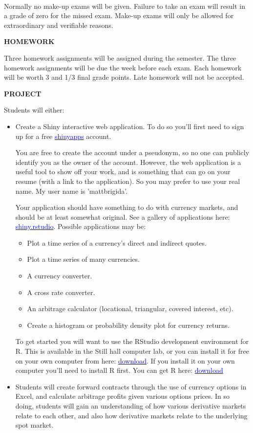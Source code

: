 \documentclass{article}
\begin{document}
\\
Normally no make-up exams will be given.  Failure to take an exam will result in a grade of zero for the missed exam.  Make-up exams will only be allowed for extraordinary and verifiable reasons.
\\
\begin{center}
{\bf HOMEWORK}
\end{center}
Three homework assignments will be assigned during the semester.   The three homework assignments will be due the week before each exam. Each homework will be worth 3 and 1/3 final grade points.  Late homework will not be accepted.
\\
\begin{center}
{\bf PROJECT}
\end{center}
Students will either:
\begin{itemize}
\item Create a Shiny interactive web application.  To do so you'll first need to sign up for a free \href{https://www.shinyapps.io/}{\textcolor{blue}{shinyapps}} account.  

You are free to create the account under a pseudonym, so no one can publicly identify you as the owner of the account.  However, the web application is a useful tool to show off your work, and is something that can go on your resume (with a link to the application).  So you may prefer to use your real name.  My user name is 'mattbrigida'.  

Your application should have something to do with currency markets, and should be at least somewhat original.  See a gallery of applications here:  \href{http://shiny.rstudio.com/}{\textcolor{blue}{shiny.rstudio}}. Possible applications may be:
\begin{itemize}
\item Plot a time series of a currency's direct and indirect quotes.
\item Plot a time series of many currencies.
\item A currency converter.
\item A cross rate converter.
\item An arbitrage calculator (locational, triangular, covered interest, etc).
\item Create a histogram or probability density plot for currency returns.
\end{itemize}
To get started you will want to use the RStudio development environment for R.  This is available in the Still hall computer lab, or you can install it for free on your own computer from here:  \href{https://www.rstudio.com/products/rstudio/download/}{\textcolor{blue}{download}}.  If you install it on your own computer you'll need to install R first.  You can get R here:  \href{https://cran.r-project.org/}{\textcolor{blue}{download}}
\item Students will create forward contracts through the use of currency options in Excel, and calculate arbitrage profits given various options prices.  In so doing, students will gain an understanding of how various derivative markets relate to each other, and also how derivative markets relate to the underlying spot market.
  \end{itemize}
\end{document}
